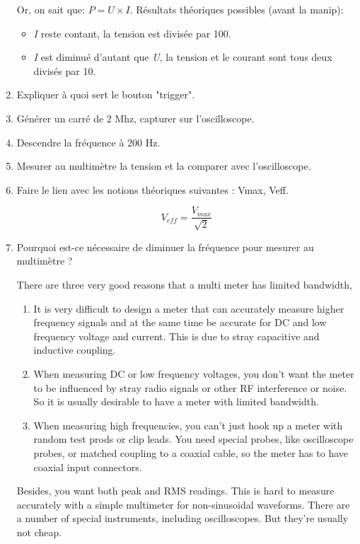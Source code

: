 \documentclass[a4paper]{article}
\begin{document}
\begin{enumerate}
\begin{example}
        Or, on sait que: $ P = U \times I $. Résultats théoriques possibles (avant la manip):
        \begin{itemize}
            \item \textit{I} reste contant, la tension est divisée par 100.
            \item \textit{I} est diminué d'autant que \textit{U}, la tension et le courant sont tous deux divisés par 10.
        \end{itemize}
    \end{example}
    \item Expliquer à quoi sert le bouton "trigger".
    \item Générer un carré de 2 Mhz, capturer sur l'oscilloscope.
    \item Descendre la fréquence à 200 Hz.
    \item Mesurer au multimètre la tension et la comparer avec l'oscilloscope.
    \item Faire le lien avec les notions théoriques suivantes : Vmax, Veff.
    \begin{example}
        \[ V_{eff} = \frac{V_{max}}{\sqrt{2}} \]
    \end{example}
    \item Pourquoi est-ce nécessaire de diminuer la fréquence pour mesurer au multimètre ?
    \begin{example}
        There are three very good reasons that a multi meter has limited bandwidth,
        \begin{enumerate}
            \item It is very difficult to design a meter that can accurately measure higher frequency signals and at the same time be accurate for DC and low frequency voltage and current. This is due to stray capacitive and inductive coupling.
            \item When measuring DC or low frequency voltages, you don’t want the meter to be influenced by stray radio signals or other RF interference or noise. So it is usually desirable to have a meter with limited bandwidth.
            \item When measuring high frequencies, you can’t just hook up a meter with random test prods or clip leads. You need special probes, like oscilloscope probes, or matched coupling to a coaxial cable, so the meter has to have coaxial input connectors.
        \end{enumerate}
        Besides, you want both peak and RMS readings. This is hard to measure accurately with a simple multimeter for non-sinusoidal waveforms. There are a number of special instruments, including oscilloscopes. But they’re usually not cheap.


\end{example}
\end{enumerate}
\end{document}
